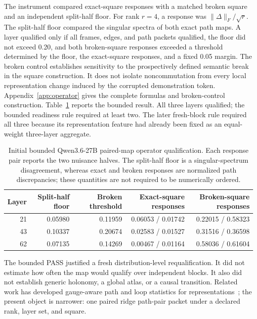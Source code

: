 \documentclass[10pt,a4paper]{article}
\begin{document}
The instrument compared exact-square responses with a matched broken square and an independent split-half floor. For rank $r=4$, a response was $\|\Delta\|_F/\sqrt r$. The split-half floor compared the singular spectra of both exact path maps. A layer qualified only if all frames, edges, and path packets qualified, the floor did not exceed 0.20, and both broken-square responses exceeded a threshold determined by the floor, the exact-square responses, and a fixed 0.05 margin. The broken control establishes sensitivity to the prospectively defined semantic break in the square construction. It does not isolate noncommutation from every local representation change induced by the corrupted demonstration token. Appendix~\ref{app:operator} gives the complete formulas and broken-control construction. Table~\ref{tab:initial-operator} reports the bounded result. All three layers qualified; the bounded readiness rule required at least two. The later fresh-block rule required all three because its representation feature had already been fixed as an equal-weight three-layer aggregate.

\begin{table}[ht]
\centering
\caption{Initial bounded Qwen3.6-27B paired-map operator qualification. Each response pair reports the two nuisance halves. The split-half floor is a singular-spectrum disagreement, whereas exact and broken responses are normalized path discrepancies; these quantities are not required to be numerically ordered.}
\label{tab:initial-operator}
\begin{tabular}{@{}rrrrr@{}}
\toprule
Layer & Split-half floor & Broken threshold & Exact-square responses & Broken-square responses \\
\midrule
21 & 0.05980 & 0.11959 & 0.06053 / 0.01742 & 0.22015 / 0.58323 \\
43 & 0.10337 & 0.20674 & 0.02583 / 0.01527 & 0.31516 / 0.36598 \\
62 & 0.07135 & 0.14269 & 0.00467 / 0.01164 & 0.58036 / 0.61604 \\
\bottomrule
\end{tabular}
\end{table}

The bounded PASS justified a fresh distribution-level requalification. It did not estimate how often the map would qualify over independent blocks. It also did not establish generic holonomy, a global atlas, or a causal transition. Related work has developed gauge-aware path and loop statistics for representations~\cite{sevetlidis2026,javidnia2026}; the present object is narrower: one paired ridge path-pair packet under a declared rank, layer set, and square.
\end{document}
